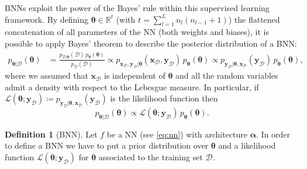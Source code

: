 \documentclass[a4paper, 11pt, reqno]{amsart}
\theoremstyle{plain}
\theoremstyle{remark}
\theoremstyle{definition}
\newtheorem{definition}[theorem]{Definition}
\newcommand{\real}{\mathbb{R}}
\newcommand{\train}{\mathcal{D}}
\begin{document}
BNNs exploit the power of the Bayes' rule within this supervised learning framework. 
By defining $\bm{\theta} \in \real^t$ (with $t = \sum_{l = 1}^L n_l (n_{l - 1} + 1)$) the flattened concatenation of all parameters of the NN (both weights and biases), it is possible to apply Bayes' theorem to describe the posterior distribution of a BNN:
\begin{equation*}
    \begin{aligned}
        p_{\bm{\theta} | \train}(\bm{\theta}) & = \frac{p_{\train | \bm{\theta}}(\train) \, p_{\bm{\theta}}(\bm{\theta})}{p_{\train}(\train)} 
        \propto  p_{\bm{x}_{\mathcal{D}}, \bm{y}_{\mathcal{D}} | \bm{\theta}} (\bm{x}_{\mathcal{D}}, \bm{y}_{\mathcal{D}}) \, p_{\bm{\theta}}(\bm{\theta}) 
        \propto p_{\bm{y}_{\mathcal{D}} | \bm{\theta}, \bm{x}_{\mathcal{D}}}(\bm{y}_{\mathcal{D}}) \, p_{\bm{\theta}}(\bm{\theta}),
    \end{aligned}
\end{equation*}
where we assumed that $\bm{x}_{\mathcal{D}}$ is independent of $\bm{\theta}$ and all the random variables admit a density with respect to the Lebesgue measure. In particular, if $\mathcal{L}(\bm{\theta}; \bm{y}_{\mathcal{D}}) \coloneqq p_{\bm{y}_{\mathcal{D}} | \bm{\theta}, \bm{x}_{\mathcal{D}}}(\bm{y}_{\mathcal{D}})$ is the likelihood function then
\begin{equation} \label{eq:bayesbnn}
    p_{\bm{\theta} | \train}(\bm{\theta}) \propto \mathcal{L}(\bm{\theta}; \bm{y}_{\mathcal{D}}) \, p_{\bm{\theta}}(\bm{\theta}).
\end{equation}

\begin{definition}[BNN] \label{def:bnn}
    Let $f$ be a NN (see \cref{eq:nn}) with architecture $\bm{\alpha}$. In order to define a BNN we have to put a prior distribution over $\bm{\theta}$ and a likelihood function $\mathcal{L}(\bm{\theta}; \bm{y}_{\mathcal{D}})$ for $\bm{\theta}$ associated to the training set $\train$.
\end{definition}
\end{document}
